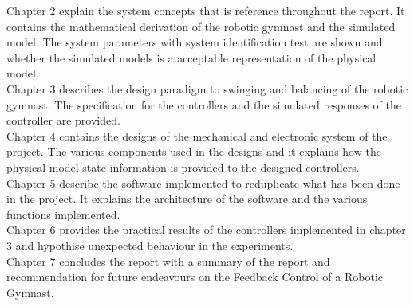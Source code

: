Chapter 2 explain the system concepts that is reference throughout the report. It contains the mathematical derivation of the robotic gymnast and the simulated model. The system parameters with system identification test are shown and whether the simulated models is a acceptable representation of the physical model.\\

Chapter 3 describes the design paradigm to swinging and balancing of the robotic gymnast. The specification for the controllers and the simulated responses of the controller are provided.\\

Chapter 4 contains the designs of the mechanical and electronic system of the project. The various components used in the designs and it explains how the physical model state information is provided to the designed controllers.\\

Chapter 5 describe the software implemented to reduplicate what has been done in the project.  It explains the architecture of the software and the various functions implemented.\\

Chapter 6 provides the practical results of the controllers implemented in chapter 3 and hypothise unexpected behaviour in the experiments.\\

Chapter 7 concludes the report with a summary of the report and recommendation for future endeavours on the Feedback Control of a Robotic Gymnast. 

 
